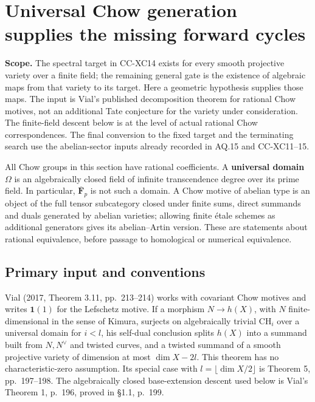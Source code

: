 \section{Universal Chow generation supplies the missing forward
cycles}\label{universal-chow-generation-supplies-the-missing-forward-cycles}

\textbf{Scope.} The spectral target in CC-XC14 exists for every smooth
projective variety over a finite field; the remaining general gate is
the existence of algebraic maps from that variety to its target. Here a
geometric hypothesis supplies those maps. The input is Vial's published
decomposition theorem for rational Chow motives, not an additional Tate
conjecture for the variety under consideration. The finite-field descent
below is at the level of actual rational Chow correspondences. The final
conversion to the fixed target and the terminating search use the
abelian-sector inputs already recorded in AQ.15 and CC-XC11--15.

All Chow groups in this section have rational coefficients. A
\textbf{universal domain} \(\Omega\) is an algebraically closed field of
infinite transcendence degree over its prime field. In particular,
\(\overline{\mathbf F}_p\) is not such a domain. A Chow motive of
abelian type is an object of the full tensor subcategory closed under
finite sums, direct summands and duals generated by abelian varieties;
allowing finite étale schemes as additional generators gives its
abelian--Artin version. These are statements about rational equivalence,
before passage to homological or numerical equivalence.

\subsection{Primary input and
conventions}\label{primary-input-and-conventions}

Vial (2017, Theorem 3.11, pp.~213--214) works with covariant Chow
motives and writes \(\mathbf 1(1)\) for the Lefschetz motive. If a
morphism \(N\to h(X)\), with \(N\) finite-dimensional in the sense of
Kimura, surjects on algebraically trivial \(\mathrm{CH}_i\) over a
universal domain for \(i<l\), his self-dual conclusion splits \(h(X)\)
into a summand built from \(N,N^\vee\) and twisted curves, and a twisted
summand of a smooth projective variety of dimension at most
\(\dim X-2l\). This theorem has no characteristic-zero assumption. Its
special case with \(l=\lfloor\dim X/2\rfloor\) is Theorem 5,
pp.~197--198. The algebraically closed base-extension descent used below
is Vial's Theorem 1, p.~196, proved in §1.1, p.~199.

